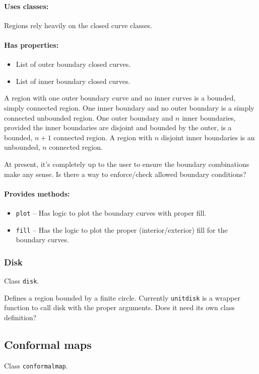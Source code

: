 \documentclass{article}
\newcommand{\code}[1]{\texttt{#1}}
\begin{document}
\paragraph{Uses classes:} Regions rely heavily on the closed curve classes.

\paragraph{Has properties:}
\begin{itemize}
  \item List of outer boundary closed curves.
  \item List of inner boundary closed curves.
\end{itemize}

A region with one outer boundary curve and no inner curves is a bounded, simply connected region. One inner boundary and no outer boundary is a simply connected unbounded region. One outer boundary and $n$ inner boundaries, provided the inner boundaries are disjoint and bounded by the outer, is a bounded, $n+1$ connected region. A region with $n$ disjoint inner boundaries is an unbounded, $n$ connected region.

At present, it's completely up to the user to ensure the boundary combinations make any sense. Is there a way to enforce/check allowed boundary conditions?

\paragraph{Provides methods:}
\begin{itemize}
  \item \code{plot} -- Has logic to plot the boundary curves with proper fill.
  \item \code{fill} -- Has the logic to plot the proper (interior/exterior) fill for the boundary curves.
\end{itemize}

\subsubsection{Disk}
Class \code{disk}.

Defines a region bounded by a finite circle. Currently \code{unitdisk} is a wrapper function to call disk with the proper arguments. Does it need its own class definition?

\subsection{Conformal maps}
Class \code{conformalmap}.
\end{document}
